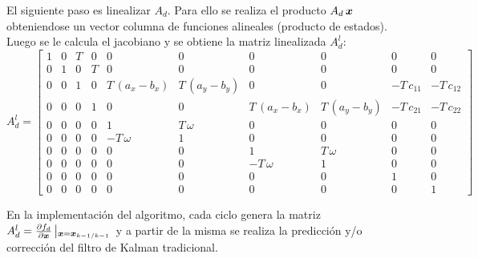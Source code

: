 		El siguiente paso es linealizar $A_d$. Para ello se realiza el producto $A_d\,\boldsymbol{x}$ obteniendose un vector columna de funciones alineales (producto de estados). Luego se le calcula el jacobiano y se obtiene la matriz linealizada $A^l_d$:
		\begin{equation*}
			A^l_d = \begin{bmatrix}	1& 0& T& 0&           0&           0&           0&           0&      0&      0\\[0.3em]
						0& 1& 0& T&           0&           0&           0&           0&      0&	     0\\[0.3em]
						0& 0& 1& 0& T\,(a_x - b_x)& T\,(a_y - b_y)&           0&           0& -T\,c_{11}& -T\,c_{12}\\[0.3em]
						0& 0& 0& 1&           0&           0& T\,(a_x - b_x)& T\,(a_y - b_y)& -T\,c_{21}& -T\,c_{22}\\[0.3em]
						0& 0& 0& 0&           1&         T\,\omega&           0&           0&      0&      0\\[0.3em]
						0& 0& 0& 0&        -T\,\omega&           1&           0&           0&      0&      0\\[0.3em]
						0& 0& 0& 0&           0&           0&           1&         T\,\omega&      0&      0\\[0.3em]
						0& 0& 0& 0&           0&           0&        -T\,\omega&           1&      0&      0\\[0.3em]
						0& 0& 0& 0&           0&           0&           0&           0&      1&      0\\[0.3em]
						0& 0& 0& 0&           0&           0&           0&           0&      0&      1
			\end{bmatrix}
		\end{equation*}

		En la implementación del algoritmo, cada ciclo genera la matriz $A^l_d = \frac{\partial{f_d}}{\partial \boldsymbol{x}}\left| _{\boldsymbol{x}=\boldsymbol{x}_{k-1/k-1}}\right. $ y a partir de la misma se realiza la predicción y/o corrección del filtro de Kalman tradicional.\\

